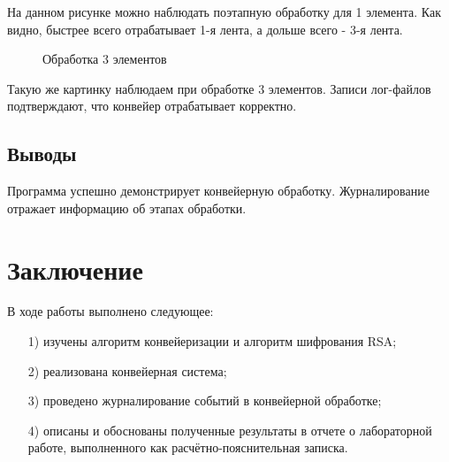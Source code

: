 \documentclass[a4paper,12pt]{article}
\begin{document}
На данном рисунке можно наблюдать поэтапную обработку
для 1 элемента. Как видно, быстрее всего отрабатывает 1-я лента, а дольше всего - 3-я лента.

\pagebreak

\begin{figure}[h!]
\caption{
Обработка 3 элементов}
\label{fig:t2}
\end{figure}


Такую же картинку наблюдаем при обработке 3 элементов.
Записи лог-файлов подтверждают, что конвейер отрабатывает
корректно.

\subsection*{Выводы}

Программа успешно демонстрирует конвейерную обработку.
Журналирование отражает информацию об этапах обработки.
\newpage


\section*{Заключение}

В ходе работы выполнено следующее:
	
\begin{enumerate} 
\item[1)] изучены алгоритм конвейеризации и алгоритм шифрования RSA;
\item[2)] реализована конвейерная система;
\item[3)] проведено журналирование событий в конвейерной обработке;
\item[4)] описаны и обоснованы полученные результаты в отчете о лабораторной 
работе, выполненного как расчётно-пояснительная записка. 
\end{enumerate}
\newpage
\end{document}

